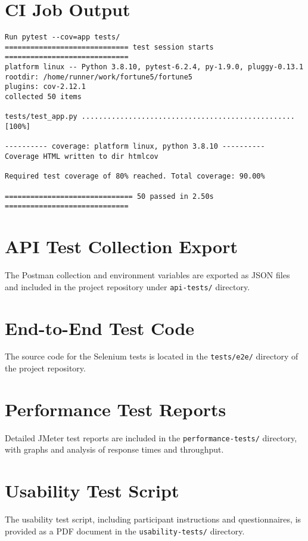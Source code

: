 \documentclass[12pt,a4paper]{report}
\begin{document}
\section{CI Job Output}
\begin{verbatim}
Run pytest --cov=app tests/
============================= test session starts =============================
platform linux -- Python 3.8.10, pytest-6.2.4, py-1.9.0, pluggy-0.13.1
rootdir: /home/runner/work/fortune5/fortune5
plugins: cov-2.12.1
collected 50 items

tests/test_app.py ..................................................    [100%]

---------- coverage: platform linux, python 3.8.10 ----------
Coverage HTML written to dir htmlcov

Required test coverage of 80% reached. Total coverage: 90.00%

============================== 50 passed in 2.50s =============================
\end{verbatim}

\section{API Test Collection Export}
The Postman collection and environment variables are exported as JSON files and included in the project repository under \texttt{api-tests/} directory.

\section{End-to-End Test Code}
The source code for the Selenium tests is located in the \texttt{tests/e2e/} directory of the project repository.

\section{Performance Test Reports}
Detailed JMeter test reports are included in the \texttt{performance-tests/} directory, with graphs and analysis of response times and throughput.

\section{Usability Test Script}
The usability test script, including participant instructions and questionnaires, is provided as a PDF document in the \texttt{usability-tests/} directory.
\end{document}
